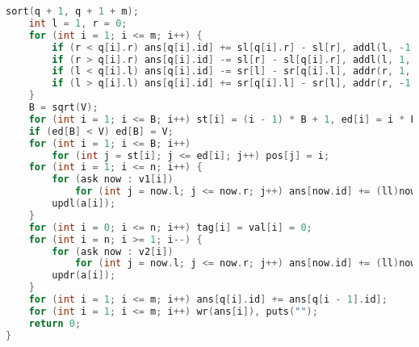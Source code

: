 \documentclass[9pt, a4paper, oneside]{book}
\begin{document}
\begin{lstlisting}[language={C++}]
    sort(q + 1, q + 1 + m);
    int l = 1, r = 0;
    for (int i = 1; i <= m; i++) {
        if (r < q[i].r) ans[q[i].id] += sl[q[i].r] - sl[r], addl(l, -1, r + 1, q[i].r, q[i].id), r = q[i].r;
        if (r > q[i].r) ans[q[i].id] -= sl[r] - sl[q[i].r], addl(l, 1, q[i].r + 1, r, q[i].id), r = q[i].r;
        if (l < q[i].l) ans[q[i].id] -= sr[l] - sr[q[i].l], addr(r, 1, l, q[i].l - 1, q[i].id), l = q[i].l;
        if (l > q[i].l) ans[q[i].id] += sr[q[i].l] - sr[l], addr(r, -1, q[i].l, l - 1, q[i].id), l = q[i].l;
    }
    B = sqrt(V);
    for (int i = 1; i <= B; i++) st[i] = (i - 1) * B + 1, ed[i] = i * B;
    if (ed[B] < V) ed[B] = V;
    for (int i = 1; i <= B; i++)
        for (int j = st[i]; j <= ed[i]; j++) pos[j] = i;
    for (int i = 1; i <= n; i++) {
        for (ask now : v1[i])
            for (int j = now.l; j <= now.r; j++) ans[now.id] += (ll)now.op * (tag[pos[a[j] + 1]] + val[a[j] + 1]);
        updl(a[i]);
    }
    for (int i = 0; i <= n; i++) tag[i] = val[i] = 0;
    for (int i = n; i >= 1; i--) {
        for (ask now : v2[i])
            for (int j = now.l; j <= now.r; j++) ans[now.id] += (ll)now.op * (tag[pos[a[j] - 1]] + val[a[j] - 1]);
        updr(a[i]);
    }
    for (int i = 1; i <= m; i++) ans[q[i].id] += ans[q[i - 1].id];
    for (int i = 1; i <= m; i++) wr(ans[i]), puts("");
    return 0;
}\end{lstlisting}
\end{document}
